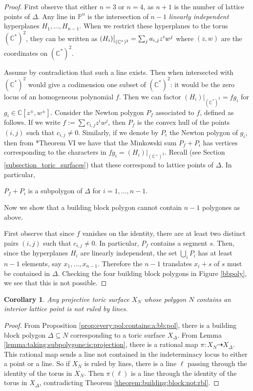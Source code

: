 \documentclass[11pt]{article} %
\newtheorem{corollary}[theorem]{Corollary}
\theoremstyle{definition}
\newcommand{\C}{{\mathbb C}}
\newcommand\restr[2]{{%
  \left.\kern-\nulldelimiterspace %
  #1 %
  \vphantom{\big|} %
  \right|_{#2} %
  }}
\begin{document}
\begin{proof}
First observe that either $n=3$ or $n=4$, as $n+1$ is the number of lattice points of $\Delta$. Any line in $\mathbb{P}^n$ is the intersection of $n-1$ \emph{linearly independent} hyperplanes $H_1,\dots,H_{n-1}$.
When we restrict these hyperplanes to the torus $(\C^*)^2$, they can be written as $\restr{(H_i)}{(\C^*)^2}=\sum_j a_{i,j}z^i w^j$ where $(z,w)$ are the coordinates on $(\C^*)^2$.

Assume by contradiction that such a line exists. Then when intersected with $(\C^*)^2$ would give a codimension one subset of $(\C^*)^2$: it would be the zero locus of an homogeneous polynomial $f$. Then we can factor $(H_i)|_{(\C^*)^2}=fg_i$ for $g_i\in\mathbb{C}[z^{\pm},w^{\pm}]$. Consider the Newton polygon $P_f$ associated to $f$, defined as follows. If we write $f:=\sum c_{i,j}z^{i}w^{j}$, then $P_f$ is the convex hull of the points $(i,j)$ such that $c_{i,j}\neq 0$. Similarly, if we denote by $P_i$ the Newton polygon of $g_i$, then from 
\cite{Ost76}*{Theorem VI} we have that the Minkowski sum $P_f + P_i$ has vertices corresponding to the characters in $fg_i=(H_i)|_{(\mathbb{C}^{\times})^2}$. Recall (see Section \ref{subsection_toric_surfaces}) that these correspond to lattice points of $\Delta$. In particular,
\begin{center} $P_f + P_i$ is a subpolygon of $\Delta$ for $i=1,\dots,n-1$.
\end{center}
Now we show that a building block polygon cannot contain $n-1$ polygones as above.

First observe that since $f$ vanishes on the identity, there are at least two distinct pairs $(i,j)$ such that $c_{i,j}\neq 0$. In particular, $P_f$ contains a segment $s$.
Then, since the hyperplanes $H_i$ are linearly independent, the set $\bigcup_i P_i$ has at least $n-1$ elements, say ${x_1, \dots, x_{n-1}}$. Therefore the $n-1$ translates $x_i +s$ of $s$ must be contained in $\Delta$. Checking the four building block polygons in Figure \ref{bbpoly}, we see that this is not possible.
\end{proof}
\begin{corollary}\label{corollary:surface:with:interior:pt:not:rbl}
Any projective toric surface $X_N$ whose polygon $N$ contains an interior lattice point is not ruled by lines.
\end{corollary}
\begin{proof}From Proposition \ref{prop:every:pol:contains:a:bb:pol}, there is a building block polygon $\Delta \subseteq N$ corresponding to a toric surface $X_\Delta$. From Lemma \ref{lemma:taking:subpolygone:is:projection}, there is a rational map $\pi : X_N\dashrightarrow X_\Delta$. This rational map sends a line not contained in the indeterminacy locus to either a point or a line. So if $X_N$ is ruled by lines, there is a line $\ell$ passing through the identity of the torus in $X_N$. Then $\pi(\ell)$ is a line through the identity of the torus in $X_\Delta$, contradicting Theorem \ref{theorem:building:block:not:rbl}.
\end{proof}
\end{document}
